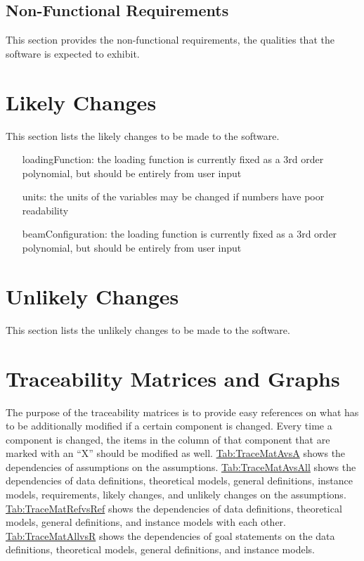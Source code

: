 \documentclass[12pt]{article}
\begin{document}
\subsection{Non-Functional Requirements}
\label{Sec:NFRs}
This section provides the non-functional requirements, the qualities that the software is expected to exhibit.

\section{Likely Changes}
\label{Sec:LCs}
This section lists the likely changes to be made to the software.

\begin{itemize}
\item[loadingFunction:\phantomsection\label{loadingFunction}]{the loading function is currently fixed as a 3rd order polynomial, but should be entirely from user input}
\item[units:\phantomsection\label{units}]{the units of the variables may be changed if numbers have poor readability}
\item[beamConfiguration:\phantomsection\label{beamConfiguration}]{the loading function is currently fixed as a 3rd order polynomial, but should be entirely from user input}
\end{itemize}
\section{Unlikely Changes}
\label{Sec:UCs}
This section lists the unlikely changes to be made to the software.

\section{Traceability Matrices and Graphs}
\label{Sec:TraceMatrices}
The purpose of the traceability matrices is to provide easy references on what has to be additionally modified if a certain component is changed. Every time a component is changed, the items in the column of that component that are marked with an ``X'' should be modified as well. \hyperref[Table:TraceMatAvsA]{Tab:TraceMatAvsA} shows the dependencies of assumptions on the assumptions. \hyperref[Table:TraceMatAvsAll]{Tab:TraceMatAvsAll} shows the dependencies of data definitions, theoretical models, general definitions, instance models, requirements, likely changes, and unlikely changes on the assumptions. \hyperref[Table:TraceMatRefvsRef]{Tab:TraceMatRefvsRef} shows the dependencies of data definitions, theoretical models, general definitions, and instance models with each other. \hyperref[Table:TraceMatAllvsR]{Tab:TraceMatAllvsR} shows the dependencies of goal statements on the data definitions, theoretical models, general definitions, and instance models.
\end{document}
